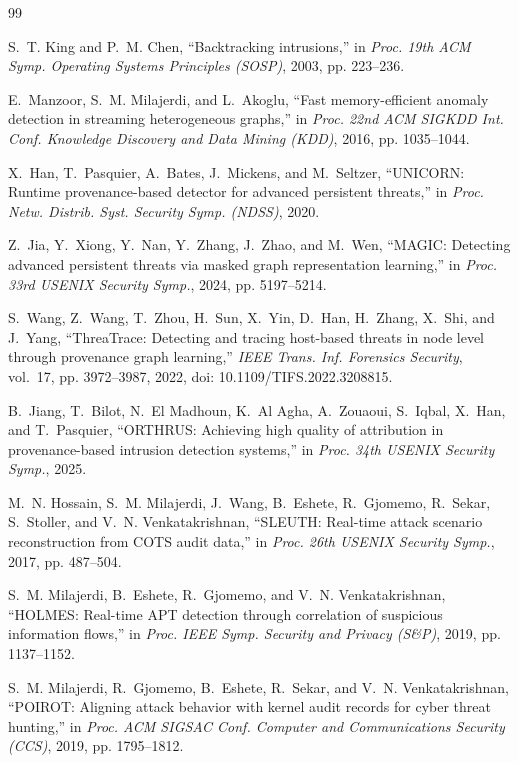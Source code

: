 \documentclass[lettersize,journal]{IEEEtran}
\begin{document}
\begin{thebibliography}{99}

S.~T. King and P.~M. Chen, ``Backtracking intrusions,'' in \emph{Proc. 19th ACM
Symp. Operating Systems Principles (SOSP)}, 2003, pp. 223--236.

E.~Manzoor, S.~M. Milajerdi, and L.~Akoglu, ``Fast memory-efficient anomaly
detection in streaming heterogeneous graphs,'' in \emph{Proc. 22nd ACM SIGKDD
Int. Conf. Knowledge Discovery and Data Mining (KDD)}, 2016, pp. 1035--1044.

X.~Han, T.~Pasquier, A.~Bates, J.~Mickens, and M.~Seltzer, ``UNICORN: Runtime
provenance-based detector for advanced persistent threats,'' in \emph{Proc. Netw.
Distrib. Syst. Security Symp. (NDSS)}, 2020.

Z.~Jia, Y.~Xiong, Y.~Nan, Y.~Zhang, J.~Zhao, and M.~Wen, ``MAGIC: Detecting
advanced persistent threats via masked graph representation learning,'' in
\emph{Proc. 33rd USENIX Security Symp.}, 2024, pp. 5197--5214.

S.~Wang, Z.~Wang, T.~Zhou, H.~Sun, X.~Yin, D.~Han, H.~Zhang, X.~Shi, and
J.~Yang, ``ThreaTrace: Detecting and tracing host-based threats in node level
through provenance graph learning,'' \emph{IEEE Trans. Inf. Forensics Security},
vol.~17, pp. 3972--3987, 2022, doi: 10.1109/TIFS.2022.3208815.

B.~Jiang, T.~Bilot, N.~El Madhoun, K.~Al Agha, A.~Zouaoui, S.~Iqbal, X.~Han,
and T.~Pasquier, ``ORTHRUS: Achieving high quality of attribution in
provenance-based intrusion detection systems,'' in \emph{Proc. 34th USENIX
Security Symp.}, 2025.

M.~N. Hossain, S.~M. Milajerdi, J.~Wang, B.~Eshete, R.~Gjomemo, R.~Sekar,
S.~Stoller, and V.~N. Venkatakrishnan, ``SLEUTH: Real-time attack scenario
reconstruction from COTS audit data,'' in \emph{Proc. 26th USENIX Security
Symp.}, 2017, pp. 487--504.

S.~M. Milajerdi, B.~Eshete, R.~Gjomemo, and V.~N. Venkatakrishnan, ``HOLMES:
Real-time APT detection through correlation of suspicious information flows,''
in \emph{Proc. IEEE Symp. Security and Privacy (S\&P)}, 2019, pp. 1137--1152.

S.~M. Milajerdi, R.~Gjomemo, B.~Eshete, R.~Sekar, and V.~N. Venkatakrishnan,
``POIROT: Aligning attack behavior with kernel audit records for cyber threat
hunting,'' in \emph{Proc. ACM SIGSAC Conf. Computer and Communications Security
(CCS)}, 2019, pp. 1795--1812.


\end{thebibliography}
\end{document}

